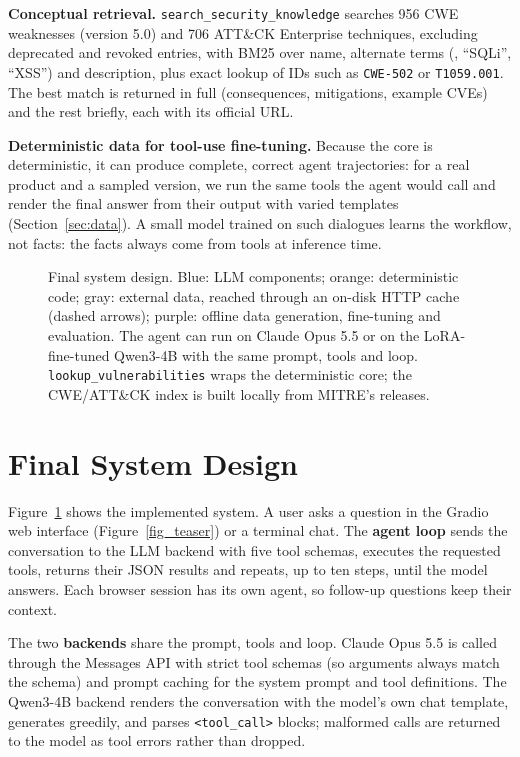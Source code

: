 \documentclass[final]{cvpr}
\begin{document}
\textbf{Conceptual retrieval.} \texttt{search\_security\_knowledge} searches 956 CWE weaknesses (version 5.0) and 706 ATT\&CK Enterprise techniques, excluding deprecated and revoked entries, with BM25 over name, alternate terms (\eg, ``SQLi'', ``XSS'') and description, plus exact lookup of IDs such as \texttt{CWE-502} or \texttt{T1059.001}. The best match is returned in full (consequences, mitigations, example CVEs) and the rest briefly, each with its official URL.

\textbf{Deterministic data for tool-use fine-tuning.} Because the core is deterministic, it can produce complete, correct agent trajectories: for a real product and a sampled version, we run the same tools the agent would call and render the final answer from their output with varied templates (Section~\ref{sec:data}). A small model trained on such dialogues learns the workflow, not facts: the facts always come from tools at inference time.

\begin{figure}[t]
\centering

\caption{Final system design. Blue: LLM components; orange: deterministic code; gray: external data, reached through an on-disk HTTP cache (dashed arrows); purple: offline data generation, fine-tuning and evaluation. The agent can run on Claude Opus 5.5 or on the LoRA-fine-tuned Qwen3-4B with the same prompt, tools and loop. \texttt{lookup\_vulnerabilities} wraps the deterministic core; the CWE/ATT\&CK index is built locally from MITRE's releases.}
\label{fig_system}
\end{figure}

\section{Final System Design}
\label{sec:design}

Figure~\ref{fig_system} shows the implemented system. A user asks a question in the Gradio~\cite{abid2019gradio} web interface (Figure~\ref{fig_teaser}) or a terminal chat. The \textbf{agent loop} sends the conversation to the LLM backend with five tool schemas, executes the requested tools, returns their JSON results and repeats, up to ten steps, until the model answers. Each browser session has its own agent, so follow-up questions keep their context.

The two \textbf{backends} share the prompt, tools and loop. Claude Opus 5.5 is called through the Messages API with strict tool schemas (so arguments always match the schema) and prompt caching for the system prompt and tool definitions. The Qwen3-4B backend renders the conversation with the model's own chat template, generates greedily, and parses \texttt{<tool\_call>} blocks; malformed calls are returned to the model as tool errors rather than dropped.
\end{document}
